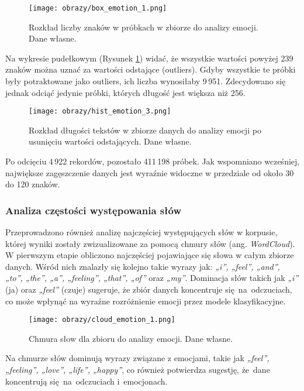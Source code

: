 \begin{figure}[H]
    \centering
    \texttt{[image: obrazy/box\_emotion\_1.png]}
    \caption{Rozkład liczby znaków w próbkach w zbiorze do analizy emocji. Dane własne.}
    \label{fig:box-emotion-1-png}
\end{figure}
Na wykresie pudełkowym (Rysunek \ref{fig:box-emotion-1-png}) widać, że wszystkie wartości powyżej 239 znaków można uznać za wartości odstające (outliers). Gdyby wszystkie te próbki były potraktowane jako outliers, ich liczba wynosiłaby 9\,951. Zdecydowano się jednak odciąć jedynie próbki, których długość jest większa niż 256.

\begin{figure}[H]
    \centering
    \texttt{[image: obrazy/hist\_emotion\_3.png]}
    \caption{Rozkład długości tekstów w zbiorze danych do analizy emocji po usunięciu wartości odstających. Dane własne.}
    \label{fig:hist-emotion-3-png}
\end{figure}
Po odcięciu 4\,922 rekordów, pozostało 411\,198 próbek. Jak wspomniano wcześniej, największe zagęszczenie danych jest wyraźnie widoczne w przedziale od około 30 do 120 znaków.


\subsubsection{Analiza częstości występowania słów}
Przeprowadzono również analizę najczęściej występujących słów w korpusie, której wyniki zostały zwizualizowane za pomocą chmury słów (ang. \textit{WordCloud}). W pierwszym etapie obliczono najczęściej pojawiające się słowa w całym zbiorze danych. Wśród nich znalazły się kolejno takie wyrazy jak: \textit{„i”, „feel”, „and”, „to”, „the”, „a”, „feeling”, „that”, „of”} oraz \textit{„my”}. Dominacja słów takich jak \textit{„i”} (ja) oraz \textit{„feel”} (czuje) sugeruje, że zbiór danych koncentruje się~na~odczuciach, co może wpłynąć na wyraźne rozróżnienie emocji przez modele klasyfikacyjne.

\begin{figure}[H]
    \centering
    \texttt{[image: obrazy/cloud\_emotion\_1.png]}
    \caption{Chmura słow dla zbioru do analizy emocji. Dane własne.}
    \label{fig:cloud-emotion-1-png}
\end{figure}
Na chmurze słów dominują wyrazy związane z emocjami, takie jak \textit{„feel”, „feeling”, „love”, „life”, „happy”}, co również potwierdza sugestję, że~dane koncentrują się~na~odczuciach i~emocjonach.

